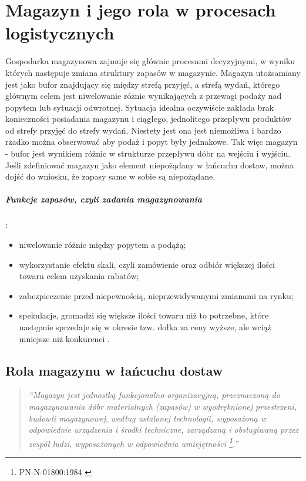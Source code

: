 \chapter{Magazyn i jego rola w procesach logistycznych}
\label{c4:c4}

	Gospodarka magazynowa zajmuje się głównie procesami decyzyjnymi, w wyniku których następuje 
	zmiana struktury zapasów w magazynie. Magazyn utożsamiany jest jako bufor znajdujący się
	między strefą przyjęć, a strefą wydań, którego głównym celem jest niwelowanie
	różnic wynikających z przewagi podaży nad popytem lub sytuacji odwrotnej. Sytuacja idealna
	oczywiście zakłada brak konieczności posiadania magazynu i ciągłego, jednolitego przepływu
	produktów od strefy przyjęć do strefy wydań. Niestety jest ona jest niemożliwa i bardzo
	rzadko można obserwować aby podaż i popyt były jednakowe. Tak więc magazyn - bufor jest
	wynikiem różnic w strukturze przepływu dóbr na wejściu i wyjściu. 
	Jeśli zdefiniować magazyn jako element niepożądany w łańcuchu dostaw, można dojść do wniosku, 
	że zapasy same w sobie są niepożądane.

	\paragraph{Funkcje zapasów, czyli zadania magazynowania}:
	\begin{itemize}
		\item niwelowanie różnic między popytem a podążą;
		\item wykorzystanie efektu skali, czyli zamówienie oraz odbiór większej ilości towaru celem uzyskania
		rabatów;
		\item zabezpieczenie przed niepewnością, nieprzewidywanymi zmianami na rynku;
		\item spekulacje, gromadzi się większe ilości towaru niż to potrzebne, które następnie sprzedaje się
		w okresie tzw. dołka za ceny wyższe, ale wciąż mniejsze niż konkurenci \cite{systemyLogistyczne_pfohl}.
	\end{itemize}		
	 
\section{Rola magazynu w łańcuchu dostaw}
	\begin{quotation}
		\textit{
			``Magazyn jest jednostką funkcjonalno-organizacyjną, przeznaczoną do magazyno\-wania
			dóbr materialnych (zapasów) w wyodrębnionej przestrzeni, budowli magazynowej, według ustalonej
			technologii, wyposażoną w odpowiednie urządzenia i środki techniczne, zarządzaną i obsługiwaną
			przez zespół ludzi, wyposażonych w odpowiednia umiejętności \footnote{PN-N-01800:1984 \cite{norm_warehouse_defintion}}.''
		}
	\end{quotation}
	
